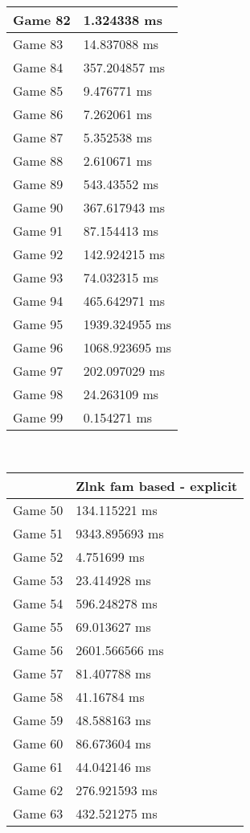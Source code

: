\begin{multicols}{2}
\begin{tabular}{|l|l|}
	Game 82 & 1.324338 ms \\ \hline
	Game 83 & 14.837088 ms \\ \hline
	Game 84 & 357.204857 ms \\ \hline
	Game 85 & 9.476771 ms \\ \hline
	Game 86 & 7.262061 ms \\ \hline
	Game 87 & 5.352538 ms \\ \hline
	Game 88 & 2.610671 ms \\ \hline
	Game 89 & 543.43552 ms \\ \hline
	Game 90 & 367.617943 ms \\ \hline
	Game 91 & 87.154413 ms \\ \hline
	Game 92 & 142.924215 ms \\ \hline
	Game 93 & 74.032315 ms \\ \hline
	Game 94 & 465.642971 ms \\ \hline
	Game 95 & 1939.324955 ms \\ \hline
	Game 96 & 1068.923695 ms \\ \hline
	Game 97 & 202.097029 ms \\ \hline
	Game 98 & 24.263109 ms \\ \hline
	Game 99 & 0.154271 ms \\ \hline
\end{tabular}\\
\begin{tabular}{|l|l|}
	\hline
	& Zlnk fam based - explicit \\ \hline
	Game 50 & 134.115221 ms \\ \hline
	Game 51 & 9343.895693 ms \\ \hline
	Game 52 & 4.751699 ms \\ \hline
	Game 53 & 23.414928 ms \\ \hline
	Game 54 & 596.248278 ms \\ \hline
	Game 55 & 69.013627 ms \\ \hline
	Game 56 & 2601.566566 ms \\ \hline
	Game 57 & 81.407788 ms \\ \hline
	Game 58 & 41.16784 ms \\ \hline
	Game 59 & 48.588163 ms \\ \hline
	Game 60 & 86.673604 ms \\ \hline
	Game 61 & 44.042146 ms \\ \hline
	Game 62 & 276.921593 ms \\ \hline
	Game 63 & 432.521275 ms \\ \hline

\end{tabular}
\end{multicols}
